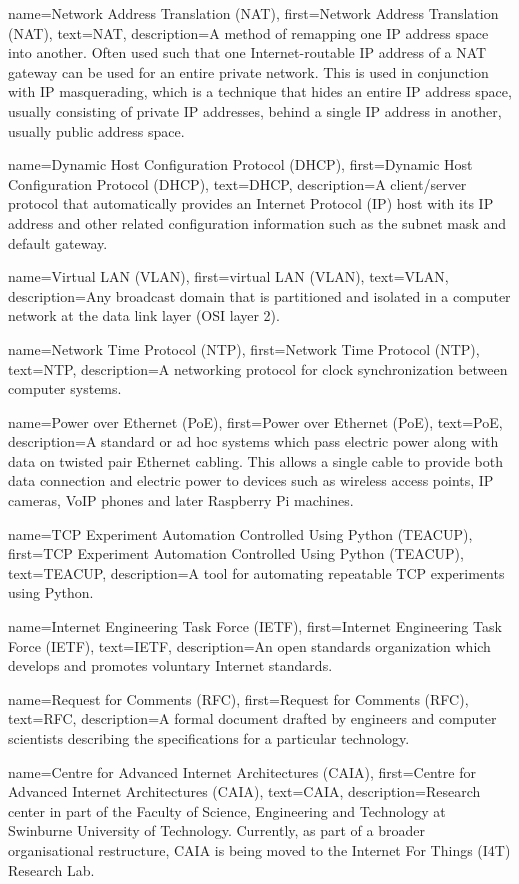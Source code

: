 {
    name={Network Address Translation (NAT)},
    first={Network Address Translation (NAT)},
    text={NAT},
    description={A method of remapping one IP address space into another. Often used such that one Internet-routable IP address of a NAT gateway can be used for an entire private network. This is used in conjunction with IP masquerading, which is a technique that hides an entire IP address space, usually consisting of private IP addresses, behind a single IP address in another, usually public address space.}
}

{
    name={Dynamic Host Configuration Protocol (DHCP)},
    first={Dynamic Host Configuration Protocol (DHCP)},
    text={DHCP},
    description={A client/server protocol that automatically provides an Internet Protocol (IP) host with its IP address and other related configuration information such as the subnet mask and default gateway.}
}

{
    name={Virtual LAN (VLAN)},
    first={virtual LAN (VLAN)},
    text={VLAN},
    description={Any broadcast domain that is partitioned and isolated in a computer network at the data link layer (OSI layer 2).}
}

{
    name={Network Time Protocol (NTP)},
    first={Network Time Protocol (NTP)},
    text={NTP},
    description={A networking protocol for clock synchronization between computer systems.}
}

{
    name={Power over Ethernet (PoE)},
    first={Power over Ethernet (PoE)},
    text={PoE},
    description={A standard or ad hoc systems which pass electric power along with data on twisted pair Ethernet cabling. This allows a single cable to provide both data connection and electric power to devices such as wireless access points, IP cameras, VoIP phones and later Raspberry Pi machines.}
}

{
    name={TCP Experiment Automation Controlled Using Python (TEACUP)},
    first={TCP Experiment Automation Controlled Using Python (TEACUP)},
    text={TEACUP},
    description={A tool for automating repeatable TCP experiments using Python.}
}

{
    name={Internet Engineering Task Force (IETF)},
    first={Internet Engineering Task Force (IETF)},
    text={IETF},
    description={An open standards organization which develops and promotes voluntary Internet standards.}
}

{
    name={Request for Comments (RFC)},
    first={Request for Comments (RFC)},
    text={RFC},
    description={A formal document drafted by engineers and computer scientists describing the specifications for a particular technology.}
}

{
    name={Centre for Advanced Internet Architectures (CAIA)},
    first={Centre for Advanced Internet Architectures (CAIA)},
    text={CAIA},
    description={Research center in part of the Faculty of Science, Engineering and Technology at Swinburne University of Technology. Currently, as part of a broader organisational restructure, CAIA is being moved to the Internet For Things (I4T) Research Lab.}
}